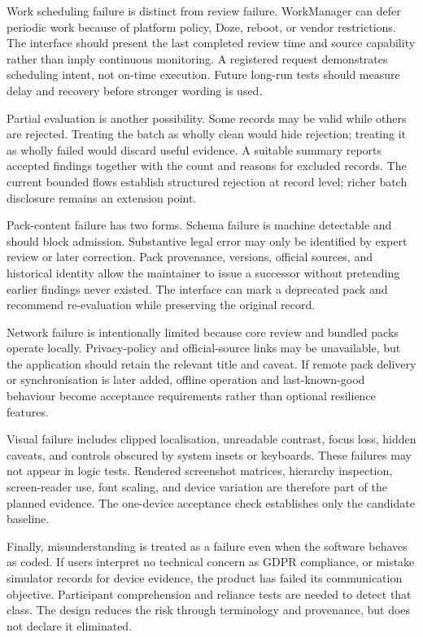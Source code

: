 Work scheduling failure is distinct from review failure. WorkManager can defer periodic work because of platform policy, Doze, reboot, or vendor restrictions. The interface should present the last completed review time and source capability rather than imply continuous monitoring. A registered request demonstrates scheduling intent, not on-time execution. Future long-run tests should measure delay and recovery before stronger wording is used.

Partial evaluation is another possibility. Some records may be valid while others are rejected. Treating the batch as wholly clean would hide rejection; treating it as wholly failed would discard useful evidence. A suitable summary reports accepted findings together with the count and reasons for excluded records. The current bounded flows establish structured rejection at record level; richer batch disclosure remains an extension point.

Pack-content failure has two forms. Schema failure is machine detectable and should block admission. Substantive legal error may only be identified by expert review or later correction. Pack provenance, versions, official sources, and historical identity allow the maintainer to issue a successor without pretending earlier findings never existed. The interface can mark a deprecated pack and recommend re-evaluation while preserving the original record.

Network failure is intentionally limited because core review and bundled packs operate locally. Privacy-policy and official-source links may be unavailable, but the application should retain the relevant title and caveat. If remote pack delivery or synchronisation is later added, offline operation and last-known-good behaviour become acceptance requirements rather than optional resilience features.

Visual failure includes clipped localisation, unreadable contrast, focus loss, hidden caveats, and controls obscured by system insets or keyboards. These failures may not appear in logic tests. Rendered screenshot matrices, hierarchy inspection, screen-reader use, font scaling, and device variation are therefore part of the planned evidence. The one-device acceptance check establishes only the candidate baseline.

Finally, misunderstanding is treated as a failure even when the software behaves as coded. If users interpret no technical concern as GDPR compliance, or mistake simulator records for device evidence, the product has failed its communication objective. Participant comprehension and reliance tests are needed to detect that class. The design reduces the risk through terminology and provenance, but does not declare it eliminated.

